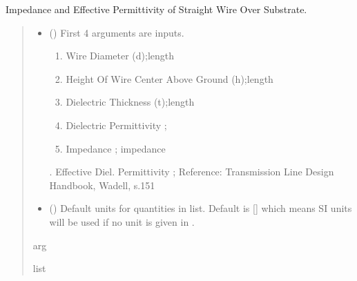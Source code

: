 \documentclass[letterpaper,10pt,english]{sphinxmanual}
\begin{document}
\begin{fulllineitems}
\label{\detokenize{components:components.Zo_eeff_StraightWireOverSubstrate}}
\pysigstartsignatures
{}
\pysigstopsignatures
\sphinxAtStartPar
Impedance and Effective Permittivity of Straight Wire Over Substrate.
\begin{quote}\begin{description}
\begin{itemize}
\item {} 
\sphinxAtStartPar
{} () \textendash{} 
\sphinxAtStartPar
First 4 arguments are inputs.
\begin{enumerate}
%
\item {} 
\sphinxAtStartPar
Wire Diameter (d);length

\item {} 
\sphinxAtStartPar
Height Of Wire Center Above Ground (h);length

\item {} 
\sphinxAtStartPar
Dielectric Thickness (t);length

\item {} 
\sphinxAtStartPar
Dielectric Permittivity ;

\item {} 
\sphinxAtStartPar
Impedance ; impedance

\end{enumerate}

.  Effective Diel. Permittivity ;
Reference:  Transmission Line Design Handbook, Wadell, s.151


\item {} 
\sphinxAtStartPar
{} (\sphinxstyleliteralemphasis{\sphinxupquote{, }}) \textendash{} Default units for quantities in  list. Default is {[}{]} which means SI units will be used if no unit is given in .

\end{itemize}

\sphinxAtStartPar
arg

\sphinxAtStartPar
list

\end{description}\end{quote}

\end{fulllineitems}
\end{document}
